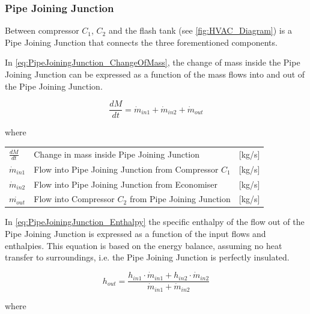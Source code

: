 \subsubsection{Pipe Joining Junction} 
Between compressor $ C_1 $, $ C_2 $ and the flash tank (see \cref{fig:HVAC_Diagram}) is a Pipe Joining Junction that connects the three forementioned components.

In \cref{eq:PipeJoiningJunction_ChangeOfMass}, the change of mass inside the Pipe Joining Junction can be expressed as a function of the mass flows into and out of the Pipe Joining Junction. 

\begin{equation} \label{eq:PipeJoiningJunction_ChangeOfMass}
	\frac{dM}{dt} = \dot{m}_{in1} + \dot{m}_{in2} + \dot{m}_{out}
\end{equation}


where 

\begin{center}
	\begin{tabular}{l p{8cm} l}
		$\frac{dM}{dt}$ & Change in mass inside Pipe Joining Junction		 	& [\si{kg}/\si{s}]\\ 
		$\dot{m}_{in1}$ & Flow into Pipe Joining Junction from Compressor $ C_1 $ 		& [\si{kg}/\si{s}]\\
		$\dot{m}_{in2}$ & Flow into Pipe Joining Junction from Economiser 				& [\si{kg}/\si{s}]\\
		$\dot{m_{out}}$ & Flow into Compressor $ C_2 $ from Pipe Joining Junction		& [\si{kg}/\si{s}]\\
	\end{tabular}
\end{center}

In \cref{eq:PipeJoiningJunction_Enthalpy} the specific enthalpy of the flow out of the Pipe Joining Junction is expressed as a function of the input flows and enthalpies. This equation is based on the energy balance, assuming no heat transfer to surroundings, i.e. the Pipe Joining Junction is perfectly insulated.

\begin{equation} \label{eq:PipeJoiningJunction_Enthalpy}
	h_{out} = \frac{h_{in1} \cdot \dot{m}_{in1} + h_{in2} \cdot \dot{m}_{in2}}{ \dot{m}_{in1} + \dot{m}_{in2} }
\end{equation}

where

